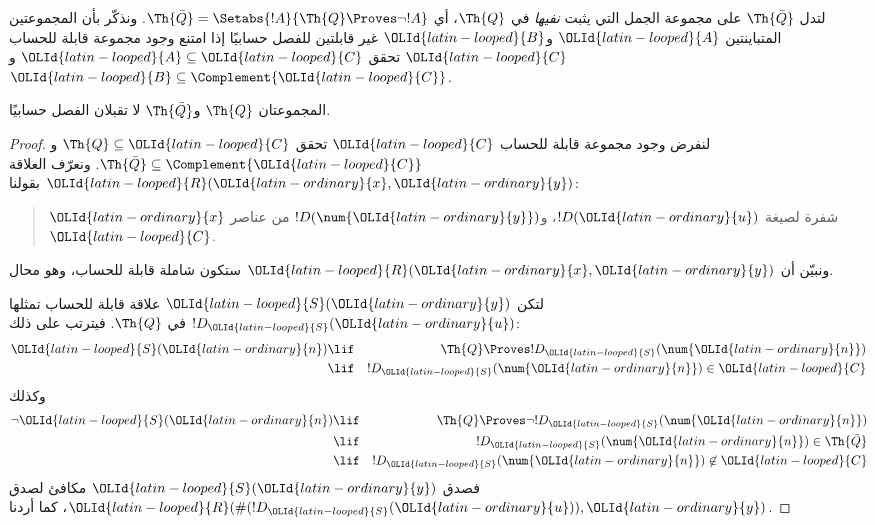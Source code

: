 \documentclass[../../../include/open-logic-section]{subfiles}
\begin{document}



لتدل $\Th{\bar Q}$ على مجموعة الجمل التي يثبت { \em نفيها}
في $\Th{Q}$، أي
$\Th{\bar Q}=\Setabs{!A}{\Th{Q}\Proves\lnot !A}$. ونذكّر بأن
المجموعتين المتباينتين ${\OLId{latin-looped}{A}}$ و${\OLId{latin-looped}{B}}$ غير قابلتين للفصل حسابيًا إذا امتنع
وجود مجموعة قابلة للحساب ${\OLId{latin-looped}{C}}$ تحقق ${\OLId{latin-looped}{A}}\subseteq {\OLId{latin-looped}{C}}$ و
${\OLId{latin-looped}{B}}\subseteq\Complement{{\OLId{latin-looped}{C}}}$.

\begin{lem}
المجموعتان $\Th{Q}$ و$\Th{\bar Q}$ لا تقبلان الفصل حسابيًا.
\end{lem}

\begin{proof}
لنفرض وجود مجموعة قابلة للحساب ${\OLId{latin-looped}{C}}$ تحقق $\Th{Q}\subseteq {\OLId{latin-looped}{C}}$ و
$\Th{\bar Q}\subseteq\Complement{{\OLId{latin-looped}{C}}}$. ونعرّف العلاقة ${\OLId{latin-looped}{R}}({\OLId{latin-ordinary}{x}},{\OLId{latin-ordinary}{y}})$ بقولنا:
\begin{quote}
${\OLId{latin-ordinary}{x}}$ شفرة لصيغة $!D({\OLId{latin-ordinary}{u}})$، و$!D(\num {\OLId{latin-ordinary}{y}})$ من عناصر ${\OLId{latin-looped}{C}}$.
\end{quote}
ونبيّن أن ${\OLId{latin-looped}{R}}({\OLId{latin-ordinary}{x}},{\OLId{latin-ordinary}{y}})$ ستكون شاملة قابلة للحساب، وهو محال.

لتكن ${\OLId{latin-looped}{S}}({\OLId{latin-ordinary}{y}})$ علاقة قابلة للحساب تمثلها $!D_{\OLId{latin-looped}{S}}({\OLId{latin-ordinary}{u}})$ في $\Th{Q}$.
فيترتب على ذلك:
\begin{eqnarray*}
{\OLId{latin-looped}{S}}({\OLId{latin-ordinary}{n}}) & \lif & \Th{Q} \Proves !D_{\OLId{latin-looped}{S}}(\num {\OLId{latin-ordinary}{n}}) \\
& \lif & !D_{\OLId{latin-looped}{S}}(\num {\OLId{latin-ordinary}{n}}) \in {\OLId{latin-looped}{C}}
\end{eqnarray*}
وكذلك
\begin{eqnarray*}
\lnot {\OLId{latin-looped}{S}}({\OLId{latin-ordinary}{n}}) & \lif & \Th{Q} \Proves \lnot !D_{\OLId{latin-looped}{S}}(\num {\OLId{latin-ordinary}{n}}) \\
& \lif & !D_{\OLId{latin-looped}{S}}(\num {\OLId{latin-ordinary}{n}}) \in \Th{\bar Q} \\
& \lif & !D_{\OLId{latin-looped}{S}}(\num {\OLId{latin-ordinary}{n}}) \not\in {\OLId{latin-looped}{C}}
\end{eqnarray*}
فصدق ${\OLId{latin-looped}{S}}({\OLId{latin-ordinary}{y}})$ مكافئ لصدق ${\OLId{latin-looped}{R}}(\#(!D_{\OLId{latin-looped}{S}}({\OLId{latin-ordinary}{u}})),{\OLId{latin-ordinary}{y}})$، كما أردنا.
\end{proof}
\end{document}
